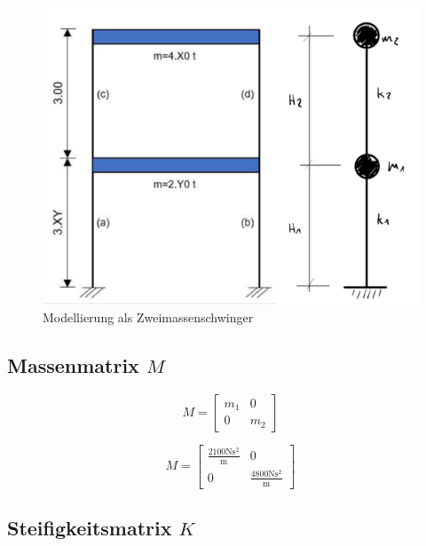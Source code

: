 \documentclass[
  letterpaper,
  DIV=11]{scrreprt}
\begin{document}
\begin{figure}[H]

{\centering \includegraphics{bilder/mms_6_modell.png}

}

\caption{\label{fig-modell_mms6}Modellierung als Zweimassenschwinger}

\end{figure}

\hypertarget{massenmatrix-m-1}{%
\subsection{\texorpdfstring{Massenmatrix
\(M\)}{Massenmatrix M}}\label{massenmatrix-m-1}}

\begin{equation}M = \left[\begin{matrix}m_{1} & 0\\0 & m_{2}\end{matrix}\right]\end{equation}

\begin{equation}M = \left[\begin{matrix}\frac{2100 \text{N} \text{s}^{2}}{\text{m}} & 0\\0 & \frac{4800 \text{N} \text{s}^{2}}{\text{m}}\end{matrix}\right]\end{equation}

\hypertarget{steifigkeitsmatrix-k-1}{%
\subsection{\texorpdfstring{Steifigkeitsmatrix
\(K\)}{Steifigkeitsmatrix K}}\label{steifigkeitsmatrix-k-1}}
\end{document}
